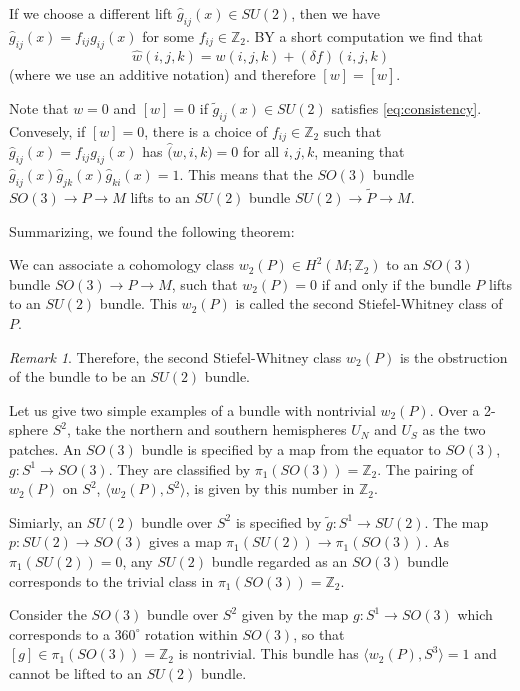 \documentclass[12pt]{article}
\numberwithin{equation}{section}
\theoremstyle{remark}
\newtheorem{remark}[definition]{Remark}
\def\bZ{\mathbb{Z}}
\begin{document}
If we choose a different lift $\hat g_{ij}(x)\in SU(2)$, then we have 
$\hat g_{ij}(x)= f_{ij} g_{ij}(x)$ for some $f_{ij}\in \bZ_2$.
BY a short computation we find that 
\begin{equation}
\hat w(i,j,k) = w(i,j,k) + (\delta f)(i,j,k)
\end{equation} (where we use an additive notation) and therefore $[w]=[\hat w]$.

Note that $w=0$ and $[w]=0$ if $\tilde g_{ij}(x)\in SU(2)$ satisfies \eqref{eq:consistency}.
Convesely, if $[w]=0$, there is a choice of $f_{ij}\in \bZ_2$ such that $\hat g_{ij}(x)= f_{ij} g_{ij}(x)$ has $\hat (w,i,k)=0$ for all $i,j,k$,
meaning that $\hat g_{ij}(x) \hat g_{jk}(x)\hat g_{ki}(x)=1$.
This means that the $SO(3)$ bundle $SO(3)\to P\to M$ lifts to an $SU(2)$ bundle $SU(2)\to \tilde P\to M$.

Summarizing, we found the following theorem:
\begin{theorem}
  We can associate a cohomology class $w_2(P)\in H^2(M;\bZ_2)$ to an $SO(3)$ bundle $SO(3)\to P\to M$,
  such that $w_2(P)=0$ if and only if the bundle $P$ lifts to an $SU(2)$ bundle.
  This $w_2(P)$ is called the second Stiefel-Whitney class of $P$.
\end{theorem}

\begin{remark}
  Therefore, the second Stiefel-Whitney class $w_2(P)$ is the obstruction of the bundle to be an $SU(2)$ bundle.
\end{remark}

Let us give two simple examples of a bundle with nontrivial $w_2(P)$.
Over a 2-sphere $S^2$, take the northern and southern hemispheres $U_N$ and $U_S$ as the two patches.
An $SO(3)$ bundle is specified by a map from the equator to $SO(3)$, $g:S^1\to SO(3)$. 
They are classified by $\pi_1(SO(3))=\bZ_2$.
The pairing of $w_2(P)$ on $S^2$, $\langle w_2(P),S^2\rangle$, is given by this number in $\bZ_2$.

Simiarly, an $SU(2)$ bundle over $S^2$ is specified by $\tilde g: S^1\to SU(2)$.
The map $p:SU(2)\to SO(3)$ gives a map $\pi_1(SU(2))\to \pi_1(SO(3))$.
As $\pi_1(SU(2))=0$,
any $SU(2)$ bundle regarded as an $SO(3)$ bundle 
corresponds to the trivial class in $\pi_1(SO(3))=\bZ_2$.

\begin{example}
Consider the $SO(3)$ bundle over $S^2$ given by 
the map $g: S^1\to SO(3)$ which corresponds to a $360^\circ$ rotation within $SO(3)$, so that $[g]\in \pi_1(SO(3))=\bZ_2$ is nontrivial.
This bundle has $\langle w_2(P),S^3\rangle=1$ and cannot be lifted to an $SU(2)$ bundle.
\end{example}
\end{document}
